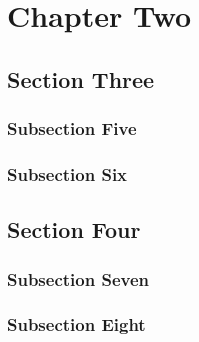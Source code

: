 \chapter{Chapter Two}
\lipsum[29-32]
\section{Section Three}
\lipsum[33-36]
\subsection{Subsection Five}
\lipsum[37-40]
\subsection{Subsection Six}
\lipsum[41-44]
\section{Section Four}
\lipsum[45-48]
\subsection{Subsection Seven}
\lipsum[49-52]
\subsection{Subsection Eight}
\lipsum[53-56]
